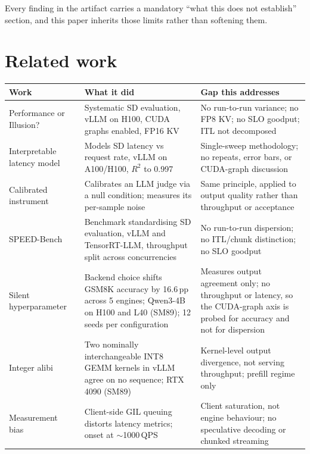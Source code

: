 \documentclass[11pt]{article}
\begin{document}
\noindent
Every finding in the artifact carries a mandatory ``what this does not
establish'' section, and this paper inherits those limits rather than
softening them.

\section{Related work}\label{sec:related}

\begin{table}[h]\centering\small
\renewcommand{\arraystretch}{1.15}
\begin{tabular}{>{\raggedright\arraybackslash}p{}>{\raggedright\arraybackslash}p{}>{\raggedright\arraybackslash}p{}}
\toprule
Work & What it did & Gap this addresses\\
\midrule
Performance or Illusion?~\cite{liu2026illusion} & Systematic SD evaluation, vLLM on H100, CUDA graphs enabled, FP16 KV & No run-to-run variance; no FP8 KV; no SLO goodput; ITL not decomposed\\
Interpretable latency model~\cite{kong2026latency} & Models SD latency vs request rate, vLLM on A100/H100, $R^2$ to 0.997 & Single-sweep methodology; no repeats, error bars, or CUDA-graph discussion\\
Calibrated instrument~\cite{kaplan2026calibrated} & Calibrates an LLM judge via a null condition; measures its per-sample noise & Same principle, applied to output quality rather than throughput or acceptance\\
SPEED-Bench~\cite{abramovich2026speedbench} & Benchmark standardising SD evaluation, vLLM and TensorRT-LLM, throughput split across concurrencies & No run-to-run dispersion; no ITL/chunk distinction; no SLO goodput\\
Silent hyperparameter~\cite{pape2026silent} & Backend choice shifts GSM8K accuracy by 16.6\,pp across 5 engines; Qwen3-4B on H100 and L40 (SM89); 12 seeds per configuration & Measures output agreement only; no throughput or latency, so the CUDA-graph axis is probed for accuracy and not for dispersion\\
Integer alibi~\cite{chen2026integer} & Two nominally interchangeable INT8 GEMM kernels in vLLM agree on no sequence; RTX 4090 (SM89) & Kernel-level output divergence, not serving throughput; prefill regime only\\
Measurement bias~\cite{chandrasekar2026bias} & Client-side GIL queuing distorts latency metrics; onset at $\sim$1000\,QPS & Client saturation, not engine behaviour; no speculative decoding or chunked streaming\\

\end{tabular}
\end{table}
\end{document}
